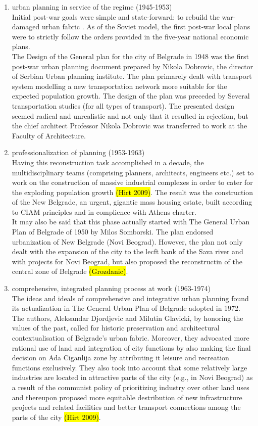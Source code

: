 \documentclass[11pt]{report}
\begin{document}
\begin{enumerate}
\item urban planning in service of the regime (1945-1953)
\\
Initial post-war goals were simple and state-forward: to rebuild the war-damaged urban fabric . As of the Soviet model, the first post-war local plans were to strictly follow the orders provided in the ﬁve-year national economic plans. 
\\
The Design of the General plan for the city of Belgrade in 1948 was the first post-war urban planning document prepared by Nikola Dobrovic, the director of Serbian Urban planning institute. The plan primarely dealt with   transport system modelling a new transportation network more suitable for the expected population growth. The design of the plan was preceded by Several transportation studies (for all types of transport). The presented design seemed radical and unrealistic and not only that it resulted in rejection, but the chief architect Professor Nikola Dobrovic was transferred to work at the Faculty of Architecture.
\item professionalization of planning (1953-1963)
\\
Having this reconstruction task accomplished in a decade, the multidisciplinary teams (comprising planners, architects, engineers etc.) set to work on the construction of massive industrial complexes in order to cater for the exploding population growth \hl{(Hirt 2009)}. The result was the construction of the New Belgrade, an urgent, gigantic mass housing estate, built according to CIAM principles and in complience with Athens charter.
\\
It may also be said that this phase actually started with The  General  Urban  Plan  of  Belgrade of 1950 by Milos Somborski. The plan endorsed urbanization of New Belgrade (Novi Beograd). However, the plan not only dealt with the expansion of the city to the lecft bank of the Sava river and with projects for Novi Beograd, but also proposed the reconstructin of the central zone of Belgrade \hl{(Grozdanic)}.
\item comprehensive, integrated planning process at work (1963-1974)
\\
The ideas and ideals of comprehensive and integrative urban planning found its actualization in The  General  Urban  Plan  of  Belgrade  adopted in 1972. The authors, Aleksandar Djordjevic and Milutin Glavicki, by honoring the values of the past, called for historic preservation and architectural contextualisation of Belgrade's urban fabric. Moreover, they advocated more  rational  use  of  land  and integration of city functions by also making the final decision on Ada Ciganlija zone by attributing it leisure and recreation functions exclusively. They also took into account that some relatively large industries are located in attractive parts of the city (e.g., in Novi Beograd) as a result of the communist policy of prioritizing industry over other land uses and thereupon proposed more equitable destribution of new infrastructure projects and related  facilities and better  transport connections  among  the  parts  of  the  city  \hl{(Hirt 2009)}.

\end{enumerate}
\end{document}
